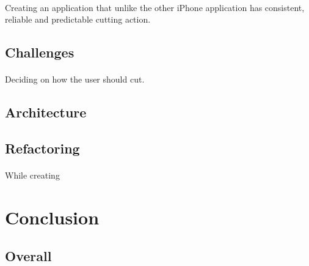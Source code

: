 \documentclass[11pt]{article}
\begin{document}
        \paragraph{}
        Creating an application that unlike the other iPhone application has consistent, reliable and predictable cutting action. 
    
    \subsection{Challenges}
    
        \paragraph{}
        Deciding on how the user should cut. 
        
    \subsection{Architecture}
        
        \paragraph{}

        
    \subsection{Refactoring}
        
        \paragraph{}
        While creating 
            
\newpage
\section{Conclusion}

        \paragraph{}
    
        \subsection{Overall}
        
            \paragraph{}
\end{document}
